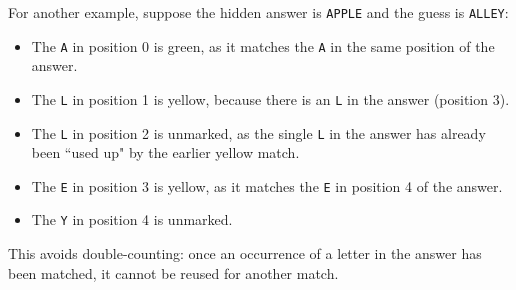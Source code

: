 \noindent For another example, suppose the hidden answer is \verb+APPLE+ and the guess is \verb+ALLEY+:
\begin{center}
\end{center}
\begin{itemize}
   \item The \verb+A+ in position 0 is green, as it matches the \verb+A+ in the same position of the answer.
   \item The \verb+L+ in position 1 is yellow, because there is an \verb+L+ in the answer (position 3).
   \item The \verb+L+ in position 2 is unmarked, as the single \verb+L+ in the answer has already been ``used up" by the earlier yellow match.
   \item The \verb+E+ in position 3 is yellow, as it matches the \verb+E+ in position 4 of the answer.
   \item The \verb+Y+ in position 4 is unmarked.
\end{itemize}
\vspace{6pt}

\noindent This avoids double-counting: once an occurrence of a letter in the answer has been matched, it cannot be reused for another match.


